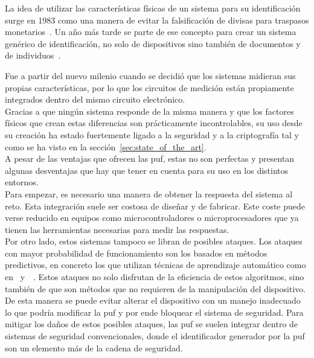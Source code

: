 \documentclass[spanish]{template/minim}
\begin{document}
La idea de utilizar las características físicas de un sistema para su identificación surge en 1983 como una manera de evitar la falsificación de divisas para traspasos monetarios~\cite{bauder}. Un año más tarde se parte de ese concepto para crear un sistema genérico de identificación, no solo de dispositivos sino también de documentos y de individuos~\cite{device_identification}.

Fue a partir del nuevo milenio cuando se decidió que los sistemas midieran sus propias características, por lo que los circuitos de medición están propiamente integrados dentro del mismo circuito electrónico.\\

Gracias a que ningún sistema responde de la misma manera y que los factores físicos que crean estas diferencias son prácticamente incontrolables, su uso desde su creación ha estado fuertemente ligado a la seguridad y a la criptografía tal y como se ha visto en la sección~\ref{sec:state_of_the_art}.\\

A pesar de las ventajas que ofrecen las \gls{puf}, estas no son perfectas y presentan algunas desventajas que hay que tener en cuenta para su uso en los distintos entornos.\\

Para empezar, es necesario una manera de obtener la respuesta del sistema al reto. Esta integración suele ser costosa de diseñar y de fabricar. Este coste puede verse reducido en equipos como microcontroladores o microprocesadores que ya tienen las herramientas necesarias para medir las respuestas.\\

Por otro lado, estos sistemas tampoco se libran de posibles ataques. Los ataques con mayor probabilidad de funcionamiento son los basados en métodos predictivos, en concreto los que utilizan técnicas de aprendizaje automático como en~\cite{puf_attacks} y~\cite{puf_attacks_2}~. Estos ataques no solo disfrutan de la eficiencia de estos algoritmos, sino también de que son métodos que no requieren de la manipulación del dispositivo. De esta manera se puede evitar alterar el dispositivo con un manejo inadecuado lo que podría modificar la \gls{puf} y por ende bloquear el sistema de seguridad. Para mitigar los daños de estos posibles ataques, las \gls{puf} se suelen integrar dentro de sistemas de seguridad convencionales, donde el identificador generador por la \gls{puf} son un elemento más de la cadena de seguridad.\\
\end{document}
